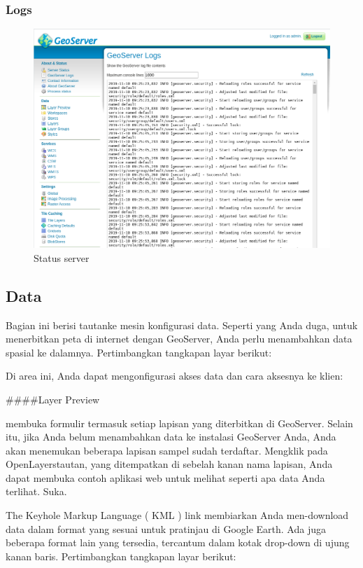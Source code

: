 \documentclass[]{book}
\begin{document}
\hypertarget{logs}{%
\subsubsection{Logs}\label{logs}}

\begin{figure}

{\centering \includegraphics[width=0.6\linewidth]{images/08/gs5} 

}

\caption{Status server}\label{fig:gs5}
\end{figure}

\hypertarget{data-1}{%
\subsection{Data}\label{data-1}}

Bagian ini berisi tautanke mesin konfigurasi data. Seperti yang Anda duga, untuk menerbitkan peta di internet dengan GeoServer, Anda perlu menambahkan data spasial ke dalamnya. Pertimbangkan tangkapan layar berikut:

Di area ini, Anda dapat mengonfigurasi akses data dan cara aksesnya ke klien:

\#\#\#\#Layer Preview

membuka formulir termasuk setiap lapisan yang diterbitkan di GeoServer. Selain itu, jika Anda belum menambahkan data ke instalasi GeoServer Anda, Anda akan menemukan beberapa lapisan sampel sudah terdaftar. Mengklik pada OpenLayerstautan, yang ditempatkan di sebelah kanan nama lapisan, Anda dapat membuka contoh aplikasi web untuk melihat seperti apa data Anda terlihat. Suka.

The Keyhole Markup Language ( KML ) link membiarkan Anda men-download data dalam format yang sesuai untuk pratinjau di Google Earth. Ada juga beberapa format lain yang tersedia, tercantum dalam kotak drop-down di ujung kanan baris. Pertimbangkan tangkapan layar berikut:
\end{document}
